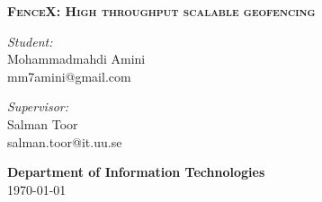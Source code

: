 \documentclass[a4]{report}
\begin{document}
\begin{titlepage}
        \noindent\makebox[\linewidth]{\rule{\linewidth}{1.2pt}}
        \textsc{ \textbf{\large FenceX: High throughput scalable geofencing }}
        \noindent\makebox[\linewidth]{\rule{\linewidth}{1.2pt}}

        \vspace{0.5in}

        \begin{minipage}{0.48\textwidth}
            \begin{flushleft}
                \textit{Student:} \\
                Mohammadmahdi Amini \\
                mm7amini@gmail.com
            \end{flushleft}
        \end{minipage}
        \begin{minipage}{0.48\textwidth}
            \begin{flushright}
                \textit{Supervisor:} \\
                Salman Toor \\
                salman.toor@it.uu.se
            \end{flushright}
        \end{minipage}

        \vspace{2in}

        \textbf{\large Department of Information Technologies} \\

        \today

    \end{titlepage}

    \null\newpage
    \setcounter{page}{2}
\end{document}
